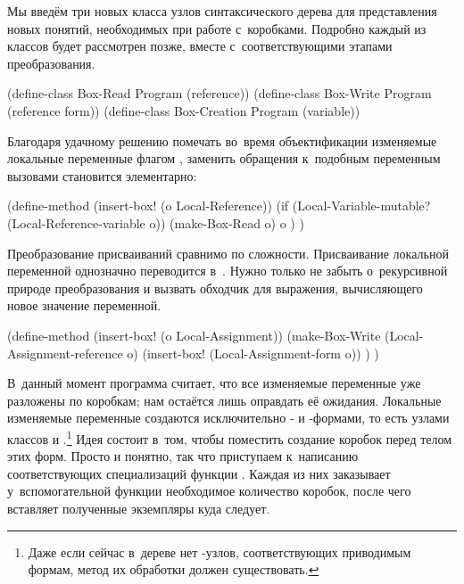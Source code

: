 Мы введём три новых класса узлов синтаксического дерева для представления новых
понятий, необходимых при работе с~коробками. Подробно каждый из классов будет
рассмотрен позже, вместе с~соответствующими этапами преобразования.

\begin{code:lisp}
(define-class Box-Read     Program (reference))
(define-class Box-Write    Program (reference form))
(define-class Box-Creation Program (variable))
\end{code:lisp}

Благодаря удачному решению помечать во~время объектификации изменяемые локальные
переменные флагом , заменить обращения к~подобным переменным
вызовами  становится элементарно:

\begin{code:lisp}
(define-method (insert-box! (o Local-Reference))
  (if (Local-Variable-mutable? (Local-Reference-variable o))
      (make-Box-Read o)
      o ) )
\end{code:lisp}

Преобразование присваиваний сравнимо по сложности. Присваивание локальной
переменной однозначно переводится в~. Нужно только не забыть
о~рекурсивной природе преобразования и вызвать обходчик для выражения,
вычисляющего новое значение переменной.

\begin{code:lisp}
(define-method (insert-box! (o Local-Assignment))
  (make-Box-Write (Local-Assignment-reference o)
                  (insert-box! (Local-Assignment-form o)) ) )
\end{code:lisp}

В~данный момент программа считает, что все изменяемые переменные уже разложены
по коробкам; нам остаётся лишь оправдать её ожидания. Локальные изменяемые
переменные создаются исключительно - и -формами, то есть
узлами классов  и .\footnote*{Даже если сейчас в~дереве
нет -узлов, соответствующих приводимым формам, метод их обработки
должен существовать.} Идея состоит в~том, чтобы поместить создание коробок перед
телом этих форм.  Просто и
понятно, так что приступаем к~написанию соответствующих специализаций функции
. Каждая из них заказывает у~вспомогательной функции необходимое
количество коробок, после чего вставляет полученные экземпляры 
куда следует.

